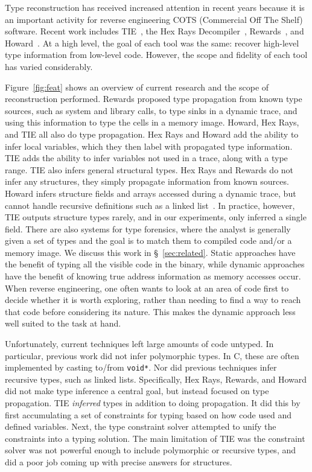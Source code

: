 Type reconstruction has received increased attention in recent years because it is an important activity for reverse engineering COTS (Commercial Off The Shelf) software. Recent work includes TIE~\cite{tie}, the Hex Rays Decompiler~\cite{ida}, Rewards~\cite{rewards}, and Howard~\cite{Slowinska2011}.  At a high level, the goal of each tool was the same: recover high-level type information from low-level code. However, the scope and fidelity of each tool has varied considerably.

Figure~\ref{fig:feat} shows an overview of current research and the scope of reconstruction performed. Rewards proposed type propagation from known type sources, such as system and library calls, to type sinks in a dynamic trace, and using this information to type the cells in a memory image. Howard, Hex Rays, and TIE all also do type propagation. Hex Rays and Howard add the ability to infer local variables, which they then label with propagated type information. TIE adds the ability to infer variables not used in a trace, along with a type range. TIE also infers general structural types.  Hex Rays and Rewards do not infer any structures, they simply propagate information from known sources. Howard infers structure fields and arrays accessed during a dynamic trace, but cannot handle recursive definitions such as a linked list~\cite{Slowinska2011}. In practice, however, TIE outputs structure types rarely, and in our experiments, only inferred a single field. There are also systems for type forensics, where the analyst is generally given a set of types and the goal is to match them to compiled code and/or a memory image. We discuss this work in \S~\ref{sec:related}.
Static approaches have the benefit of typing all the visible code in the binary, while dynamic approaches have the benefit of knowing true address information as memory accesses occur.
When reverse engineering, one often wants to look at an area of code first to decide whether it is worth exploring, rather than needing to find a way to reach that code before considering its nature. This makes the dynamic approach less well suited to the task at hand.

Unfortunately, current techniques left large amounts of code untyped. In particular, previous work did not infer polymorphic types. In C, these are often implemented by casting to/from \texttt{void*}. Nor did previous techniques infer recursive types, such as linked lists. Specifically, Hex Rays, Rewards, and Howard did not make type inference a central goal, but instead focused on type propagation. TIE \emph{inferred} types in addition to doing propagation. It did this by first accumulating a set of constraints for typing based on how code used and defined variables. Next, the type constraint solver attempted to unify the constraints into a typing solution. The main limitation of TIE was the constraint solver was not powerful enough to include polymorphic or recursive types, and did a poor job coming up with precise answers for structures. 


